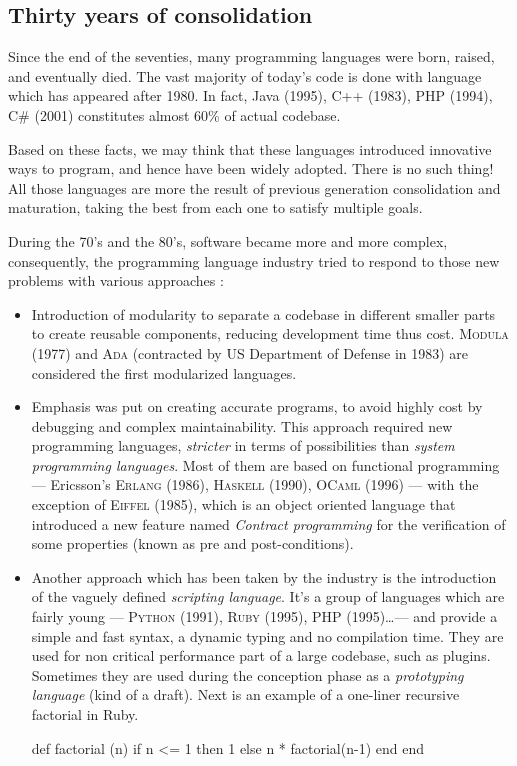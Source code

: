 \documentclass[a4paper]{article}
\begin{document}
\subsection{Thirty years of consolidation}
Since the end of the seventies, many programming languages were born, raised, and eventually died. 
The vast majority of today's code is done with language which has appeared after 1980. In fact, Java (1995), C++ (1983), PHP (1994), C\# (2001) constitutes almost 60\% of actual codebase.

Based on these facts, we may think that these languages introduced innovative ways to program, and hence have been widely adopted. There is no such thing! All those languages are more the result of previous generation consolidation and maturation, taking the best from each one to satisfy multiple goals.

During the 70's and the 80's, software became more and more complex, consequently, the programming language industry tried to respond to those new problems with various approaches :
\begin{itemize}
\item
Introduction of modularity to separate a codebase in different smaller parts to create reusable components, reducing development time thus cost. \textsc{Modula} (1977) and \textsc{Ada} (contracted by US Department of Defense in 1983) are considered the first modularized languages.

\item
Emphasis was put on creating accurate programs, to avoid highly cost by debugging and complex maintainability. This approach required new programming languages, \emph{stricter} in terms of possibilities than \emph{system programming languages}. Most of them are based on functional programming --- Ericsson's \textsc{Erlang} (1986), \textsc{Haskell} (1990), \textsc{OCaml} (1996) --- with the exception of \textsc{Eiffel} (1985), which is an object oriented language that introduced a new feature named \emph{Contract programming} for the verification of some properties (known as pre and post-conditions).
\item
Another approach which has been taken by the industry is the introduction of the vaguely defined \emph{scripting language}. It's a group of languages which are fairly young --- \textsc{Python} (1991), \textsc{Ruby} (1995), \textsc{PHP} (1995)\ldots --- and provide a simple and fast syntax, a dynamic typing and no compilation time. They are used for non critical performance part of a large codebase, such as plugins. Sometimes they are used during the conception phase as a \emph{prototyping language} (kind of a draft). Next is an example of a one-liner recursive factorial in Ruby.
\begin{rubycode}
def factorial (n)
  if n <= 1 then 1 else n * factorial(n-1) end
end
\end{rubycode}
\end{itemize}
\end{document}
